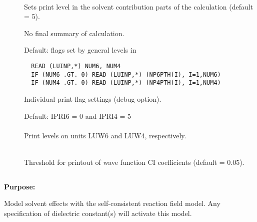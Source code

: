 \begin{description}
\item[]
   \\
  Sets print level in the solvent contribution parts of the
  calculation (default = 5).

\item[]
  No final summary of calculation.

\item[]
 Default: flags set by general levels in 
\begin{verbatim}
  READ (LUINP,*) NUM6, NUM4
  IF (NUM6 .GT. 0) READ (LUINP,*) (NP6PTH(I), I=1,NUM6)
  IF (NUM4 .GT. 0) READ (LUINP,*) (NP4PTH(I), I=1,NUM4)
\end{verbatim}
  Individual print flag settings (debug option).

\item[]
  Default: IPRI6 = 0 and IPRI4 = 5 \\
   \\
  Print levels on units LUW6 and LUW4, respectively.
%
%
\item[]
   \\
  Threshold for printout of wave function CI coefficients (default = 0.05).
 \end{description}



\ifsolvent
\pagebreak[3]
\subsection{\label{ref-solinp}}

{\bf Purpose:}

Model solvent effects with the self-consistent
reaction field model.
Any specification of dielectric constant(s)
will activate this model.

